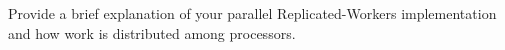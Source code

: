Provide a brief explanation of your parallel Replicated-Workers implementation and how work is distributed among processors. 